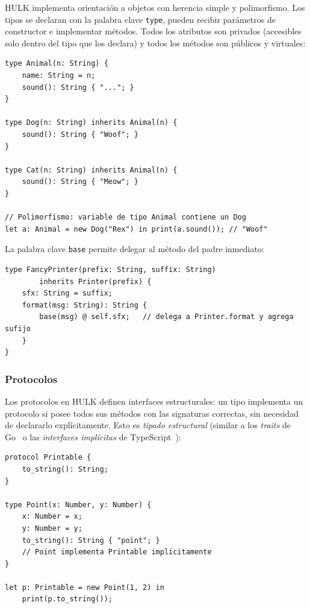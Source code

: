\documentclass[12pt, a4paper]{article}
\begin{document}
HULK implementa orientación a objetos con herencia simple y polimorfismo.
Los tipos se declaran con la palabra clave \texttt{type}, pueden recibir
parámetros de constructor e implementar métodos. Todos los atributos son
privados (accesibles solo dentro del tipo que los declara) y todos los métodos
son públicos y virtuales:

\begin{lstlisting}[caption={Tipos, herencia y polimorfismo en HULK}, label=lst:oop]
type Animal(n: String) {
    name: String = n;
    sound(): String { "..."; }
}

type Dog(n: String) inherits Animal(n) {
    sound(): String { "Woof"; }
}

type Cat(n: String) inherits Animal(n) {
    sound(): String { "Meow"; }
}

// Polimorfismo: variable de tipo Animal contiene un Dog
let a: Animal = new Dog("Rex") in print(a.sound()); // "Woof"
\end{lstlisting}

La palabra clave \texttt{base} permite delegar al método del padre inmediato:

\begin{lstlisting}[caption={Uso de base para delegación}, label=lst:base]
type FancyPrinter(prefix: String, suffix: String)
        inherits Printer(prefix) {
    sfx: String = suffix;
    format(msg: String): String {
        base(msg) @ self.sfx;   // delega a Printer.format y agrega sufijo
    }
}
\end{lstlisting}

\subsubsection{Protocolos}

Los protocolos en HULK definen interfaces estructurales: un tipo implementa un
protocolo si posee todos sus métodos con las signaturas correctas, sin necesidad
de declararlo explícitamente. Esto es \textit{tipado estructural} (similar a los
\textit{traits} de Go~\cite{donovan2015} o las \textit{interfaces implícitas} de TypeScript~\cite{bierman2014}):

\begin{lstlisting}[caption={Protocolos como interfaces estructurales}, label=lst:protocol]
protocol Printable {
    to_string(): String;
}

type Point(x: Number, y: Number) {
    x: Number = x;
    y: Number = y;
    to_string(): String { "point"; }
    // Point implementa Printable implícitamente
}

let p: Printable = new Point(1, 2) in
    print(p.to_string());
\end{lstlisting}
\end{document}

